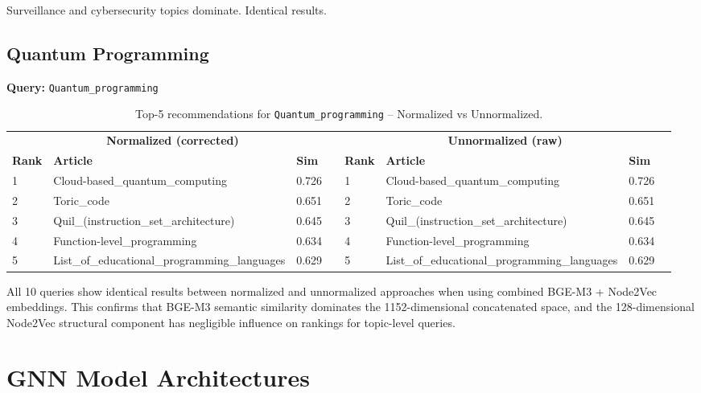 \documentclass[12pt,a4paper]{article}
\begin{document}
Surveillance and cybersecurity topics dominate.  Identical results.

\subsection{Quantum Programming}

\textbf{Query:} \texttt{Quantum\_programming}

\begin{table}[H]
\centering
\caption{Top-5 recommendations for \texttt{Quantum\_programming} -- Normalized vs Unnormalized.}
\label{tab:quantum}
\begin{tabular}{lllr|lllr}
\toprule
\multicolumn{4}{c}{\textbf{Normalized (corrected)}} & \multicolumn{4}{c}{\textbf{Unnormalized (raw)}} \\
\cmidrule(lr){1-4}\cmidrule(lr){5-8}
\textbf{Rank} & \textbf{Article} & \textbf{Sim} & & \textbf{Rank} & \textbf{Article} & \textbf{Sim} \\
\midrule
1 & Cloud-based\_quantum\_computing & 0.726 & & 1 & Cloud-based\_quantum\_computing & 0.726 \\
2 & Toric\_code & 0.651 & & 2 & Toric\_code & 0.651 \\
3 & Quil\_(instruction\_set\_architecture) & 0.645 & & 3 & Quil\_(instruction\_set\_architecture) & 0.645 \\
4 & Function-level\_programming & 0.634 & & 4 & Function-level\_programming & 0.634 \\
5 & List\_of\_educational\_programming\_languages & 0.629 & & 5 & List\_of\_educational\_programming\_languages & 0.629 \\
\bottomrule
\end{tabular}
\end{table}

All 10 queries show identical results between normalized and unnormalized approaches
when using combined BGE-M3 + Node2Vec embeddings.  This confirms that BGE-M3
semantic similarity dominates the 1152-dimensional concatenated space, and the
128-dimensional Node2Vec structural component has negligible influence on rankings
for topic-level queries.

\section{GNN Model Architectures}
\end{document}
